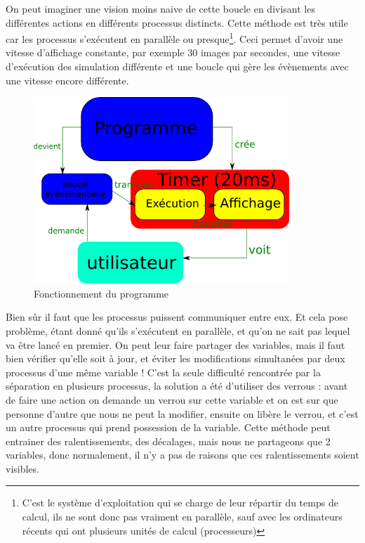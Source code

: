 On peut imaginer une vision moins naive de cette boucle en divisant les différentes actions en différents processus distincts. Cette méthode est très utile car les processus s'exécutent en parallèle ou presque\footnote{C'est le système d'exploitation qui se charge de leur répartir du temps de calcul, ils ne sont donc pas vraiment en parallèle, sauf avec les ordinateurs récents qui ont plusieurs unités de calcul (processeurs)}. Ceci permet d'avoir une 
vitesse d'affichage constante, par exemple 30 images par secondes, une vitesse d'exécution des simulation différente et une boucle qui gère les évènements avec une vitesse encore différente.

\begin{figure}[H]
	\centering
	\includegraphics[width=26em]{Images/fonctionnement_programme.png}
	\caption{Fonctionnement du programme}
\end{figure}


Bien sûr il faut que les processus puissent communiquer entre eux. Et cela pose problème, étant donné qu'ils s'exécutent en parallèle, et qu'on ne sait pas lequel va être lancé en premier. On peut leur faire partager des variables, mais il faut bien vérifier qu'elle soit à jour, et éviter les modifications simultanées par deux processus d'une même variable ! C'est la seule difficulté rencontrée par la séparation en plusieurs processus, la solution a été d'utiliser des verrous : avant de faire une action on demande un verrou sur cette variable et on est sur que personne d'autre que nous ne peut la modifier, ensuite on libère le verrou, et c'est un autre processus qui prend possession de la variable. Cette méthode peut entrainer des ralentissements, des décalages, mais nous ne partageons que 2 variables, donc normalement, il n'y a pas de raisons que ces ralentissements soient visibles.
